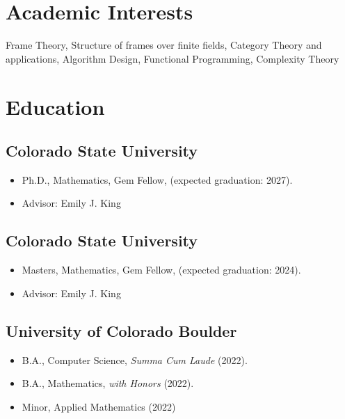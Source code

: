 \documentclass{cv_style}
\begin{document}

    \begin{center}  

    
	\end{center}
	
	\section{Academic Interests}
	Frame Theory, Structure of frames over finite fields, Category Theory and applications, Algorithm Design, Functional Programming, Complexity Theory

	\section{Education}
		\subsection{Colorado State University}
				\begin{itemize}
					\item Ph.D., Mathematics, Gem Fellow, (expected graduation: 2027).
					\item Advisor: Emily J. King
				\end{itemize}

		\subsection{Colorado State University}
				\begin{itemize}
					\item Masters, Mathematics, Gem Fellow, (expected graduation: 2024).
					\item Advisor: Emily J. King
				\end{itemize}
				
		\subsection{University of Colorado Boulder}
				\begin{itemize}
					\item B.A., Computer Science, \textit{Summa Cum Laude} (2022).
					\item B.A., Mathematics, \textit{with Honors} (2022).
					\item Minor, Applied Mathematics (2022)
				\end{itemize}
	
\end{document}
